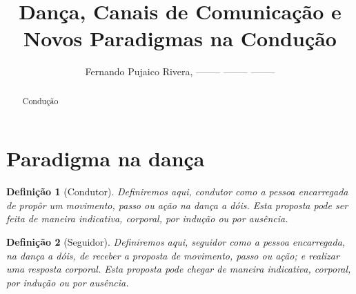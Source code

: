 \documentclass[a4paper,10pt]{article}
\title{Dança, Canais de Comunicação e Novos Paradigmas na Condução}
\author{Fernando Pujaico Rivera, -------- -------- --------}
\newtheorem{mydef}{Definição}
\begin{document}
\maketitle

\begin{abstract}
Condução
\end{abstract}


\section{Paradigma na dança}


\begin{mydef}[Condutor]
Definiremos aqui, condutor como a pessoa encarregada de propôr um movimento, passo ou ação na dança a dóis.
Esta proposta pode ser feita de maneira indicativa, corporal, por indução ou por ausência.
\end{mydef}

\begin{mydef}[Seguidor]
Definiremos aqui, seguidor como a pessoa encarregada, na dança a dóis, 
de  receber a proposta de movimento, passo ou ação;
e realizar uma resposta corporal.
Esta proposta pode chegar de maneira indicativa, corporal, por indução ou por ausência.
\end{mydef}
\end{document}
